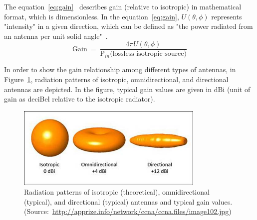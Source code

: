 \documentclass[12pt, oneandhalf, chaparabic, sees, ms]{metu}
\begin{document}
The equation~\ref{eq:gain}~\cite[p.~62]{balanis2016} describes gain (relative to isotropic) in mathematical format, which is dimensionless.
In the equation~\ref{eq:gain}, $U(\theta, \phi)$ represents "intensity" in a given direction, which can be defined as 
"the power radiated from an antenna per unit solid angle"~\cite[p.~37]{balanis2016}. 
\begin{equation}
\text{Gain}~=~\frac{4\pi U(\theta, \phi)}{\text{P$_{in}$(lossless isotropic source)}} \label{eq:gain}
\end{equation}
% 

\newpage

In order to show the gain relationship among different types of antennas, in Figure~\ref{fig:iso-omni-dir},
radiation patterns of isotropic, omnidirectional, and directional antennas are depicted. In the figure, typical gain values are given in 
dBi (unit of gain as deciBel relative to the isotropic radiator).
% 
%
%
\begin{figure}[!htbp]
 \begin{center}
  \includegraphics[width=0.8\textwidth]{iso-omni-dir.png}
 \end{center}
 \caption{Radiation patterns of isotropic (theoretical), omnidirectional (typical), and directional (typical) antennas and typical gain values. (Source:~\protect\url{http://apprize.info/network/ccna/ccna.files/image102.jpg})}
  \label{fig:iso-omni-dir}
\end{figure}
% 
%
%
%
\newpage
\end{document}
